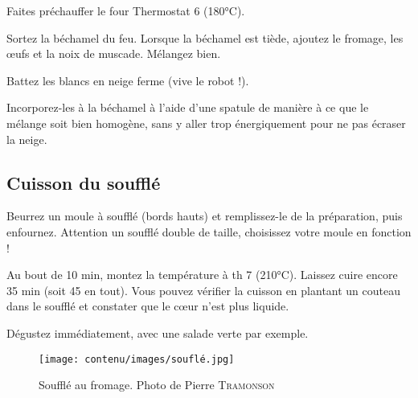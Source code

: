 \begin{instructions}

	\item Faites préchauffer le four Thermostat 6 (180°C).
	\item Sortez la béchamel du feu. Lorsque la béchamel est tiède, ajoutez le
	fromage, les œufs et la noix de muscade. Mélangez bien.
	\item Battez les blancs en neige ferme (vive le robot !).
	\item Incorporez-les à la béchamel à l’aide d’une spatule de manière à ce
	que le mélange soit bien homogène, sans y aller trop énergiquement pour
	ne pas écraser la neige.

\end{instructions}

\subsection*{Cuisson du soufflé}

\begin{instructions}

	\item Beurrez un moule à soufflé (bords hauts) et remplissez-le de la
	préparation, puis enfournez. Attention un soufflé double de taille,
	choisissez votre moule en fonction !
	\item  Au bout de 10 min, montez la température à th 7 (210°C). Laissez
	cuire encore 35 min (soit 45 en tout). Vous pouvez vérifier la cuisson en
	plantant un couteau dans le soufflé et constater que le cœur n’est plus
	liquide.
	\item Dégustez immédiatement, avec une salade verte par exemple.

\end{instructions}

\begin{figure}[h]
	\begin{center}
		\texttt{[image: contenu/images/souflé.jpg]}
	\end{center}
	\caption{Soufflé au fromage. Photo de Pierre \textsc{Tramonson}}
	\label{fig:souffle}
\end{figure}